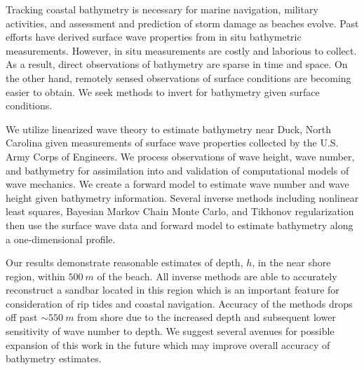 Tracking coastal bathymetry is necessary for marine navigation, military activities, and assessment and prediction of storm damage as beaches evolve. Past efforts have derived surface wave properties from in situ bathymetric measurements. However, in situ measurements are costly and laborious to collect. As a result, direct observations of bathymetry are sparse in time and space. On the other hand, remotely sensed observations of surface conditions are becoming easier to obtain. We seek methods to invert for bathymetry given surface conditions. 

We utilize linearized wave theory to estimate bathymetry near Duck, North Carolina given measurements of surface wave properties collected by the U.S. Army Corps of Engineers. We process observations of wave height, wave number, and bathymetry for assimilation into and validation of computational models of wave mechanics. We create a forward model to estimate wave number and wave height given bathymetry information. Several inverse methods including nonlinear least squares, Bayesian Markov Chain Monte Carlo, and Tikhonov regularization then use the surface wave data and forward model to estimate bathymetry along a one-dimensional profile.

Our results demonstrate reasonable estimates of depth, $h$, in the near shore region, within $500~m$ of the beach. All inverse methods are able to accurately reconstruct a sandbar located in this region which is an important feature for consideration of rip tides and coastal navigation. Accuracy of the methods drops off past $\sim550~m$ from shore due to the increased depth and subsequent lower sensitivity of wave number to depth. We suggest several avenues for possible expansion of this work in the future which may improve overall accuracy of bathymetry estimates.